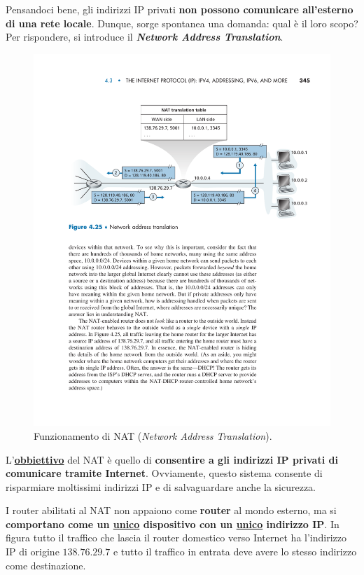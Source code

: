 \documentclass[a4paper]{article}
\begin{document}
	Pensandoci bene, gli indirizzi IP privati \textbf{non possono comunicare all'esterno di una rete locale}. Dunque, sorge spontanea una domanda: qual è il loro scopo?\newline
	Per rispondere, si introduce il \textcolor{Red3}{\textbf{\emph{Network Address Translation}}}.
	\begin{figure}[!htp]
		\centering
		\includegraphics[width=\textwidth]{img/NAT.pdf}
		\caption{Funzionamento di \textsf{NAT} (\emph{Network Address Translation}).}
	\end{figure}

	\noindent
	L’\underline{\textbf{obbiettivo}} del \textsf{NAT} è quello di \textbf{consentire a gli indirizzi IP privati di comunicare tramite Internet}. Ovviamente, questo sistema consente di risparmiare moltissimi indirizzi IP e di salvaguardare anche la sicurezza.\newline
	
	\noindent
	I router abilitati al \textsf{NAT} non appaiono come \textbf{router} al mondo esterno, ma si \textbf{comportano come un \underline{unico} dispositivo con un \underline{unico} indirizzo IP}. In figura tutto il traffico che lascia il router domestico verso Internet ha l’indirizzo IP di origine $138.76.29.7$ e tutto il traffico in entrata deve avere lo stesso indirizzo come destinazione.\newline
	
\end{document}
